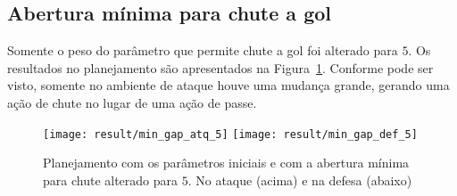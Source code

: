 \subsection{Abertura mínima para chute a gol}

Somente o peso do parâmetro que permite chute a gol foi alterado para $5$.  Os
resultados no planejamento são apresentados na Figura~\ref{fig:min_gap_5}.
Conforme pode ser visto, somente no ambiente de ataque houve uma mudança grande,
gerando uma ação de chute no lugar de uma ação de passe.

\begin{figure}[H]
  \centering
  \texttt{[image: result/min\_gap\_atq\_5]}
  \texttt{[image: result/min\_gap\_def\_5]}
  \caption{Planejamento com os parâmetros iniciais e com a abertura mínima para
  chute alterado para $5$.  No ataque (acima) e na defesa (abaixo)}\label{fig:min_gap_5}
\end{figure}

